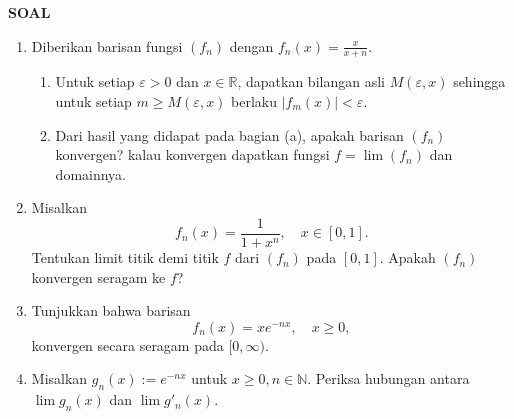 \documentclass[12pt,openany,a4paper]{article}
\newcommand{\R}{\mathbb{R}}
\newcommand{\N}{\mathbb{N}}
\begin{document}
\textbf{SOAL}
\begin{enumerate}
    \item Diberikan barisan fungsi $(f_n)$ dengan $f_n(x) = \frac{x}{x+n}$.
    \begin{enumerate}[label=(\alph*)]
        \item Untuk setiap $\varepsilon > 0$ dan $x \in \R$, dapatkan bilangan asli $M(\varepsilon, x)$ sehingga untuk setiap $m \ge M(\varepsilon, x)$ berlaku $|f_m(x)| < \varepsilon$.
        \item Dari hasil yang didapat pada bagian (a), apakah barisan $(f_n)$ konvergen? kalau konvergen dapatkan fungsi $f = \lim(f_n)$ dan domainnya.
    \end{enumerate}
    
    \item Misalkan
    \[f_n(x) = \frac{1}{1+x^n},\quad x \in [0,1].\]
    Tentukan limit titik demi titik $f$ dari $(f_n)$ pada $[0,1]$. Apakah $(f_n)$ konvergen seragam ke $f$?
    
    \item Tunjukkan bahwa barisan
    \[f_n(x) = xe^{-nx},\quad x \ge 0,\]
    konvergen secara seragam pada $[0,\infty)$.
    
    \item Misalkan $g_n(x) := e^{-nx}$ untuk $x \ge 0, n \in \N$. Periksa hubungan antara $\lim g_n(x)$ dan $\lim g'_n(x)$.
\end{enumerate}
\end{document}
